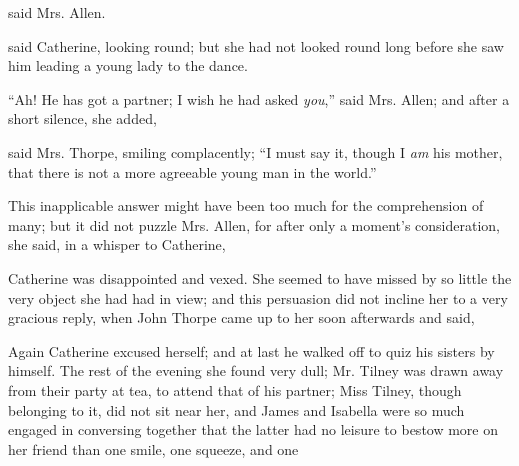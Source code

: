 

 said Mrs. Allen.



 said Catherine, looking round; but she had not looked round long before she saw him leading a young lady to the dance.

“Ah! He has got a partner; I wish he had asked {\em you},” said Mrs. Allen; and after a short silence, she added, 

 said Mrs. Thorpe, smiling complacently; “I must say it, though I {\em am} his mother, that there is not a more agreeable young man in the world.”

This inapplicable answer might have been too much for the comprehension of many; but it did not puzzle Mrs. Allen, for after only a moment's consideration, she said, in a whisper to Catherine, 

Catherine was disappointed and vexed. She seemed to have missed by so little the very object she had had in view; and this persuasion did not incline her to a very gracious reply, when John Thorpe came up to her soon afterwards and said, 



Again Catherine excused herself; and at last he walked off to quiz his sisters by himself. The rest of the evening she found very dull; Mr. Tilney was drawn away from their party at tea, to attend that of his partner; Miss Tilney, though belonging to it, did not sit near her, and James and Isabella were so much engaged in conversing together that the latter had no leisure to bestow more on her friend than one smile, one squeeze, and one 

